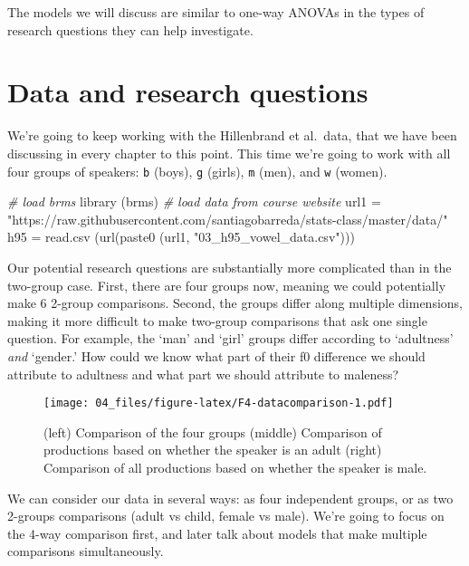 \documentclass[
]{book}
\newenvironment{Shaded}{\begin{snugshade}}{\end{snugshade}}
\newcommand{\CommentTok}[1]{\textcolor[rgb]{0.56,0.35,0.01}{\textit{#1}}}
\newcommand{\FunctionTok}[1]{\textcolor[rgb]{0.00,0.00,0.00}{#1}}
\newcommand{\NormalTok}[1]{#1}
\newcommand{\OtherTok}[1]{\textcolor[rgb]{0.56,0.35,0.01}{#1}}
\newcommand{\StringTok}[1]{\textcolor[rgb]{0.31,0.60,0.02}{#1}}
\begin{document}
The models we will discuss are similar to one-way ANOVAs in the types of research questions they can help investigate.

\hypertarget{data-and-research-questions-3}{%
\section{Data and research questions}\label{data-and-research-questions-3}}

We're going to keep working with the Hillenbrand et al.~data, that we have been discussing in every chapter to this point. This time we're going to work with all four groups of speakers: \texttt{b} (boys), \texttt{g} (girls), \texttt{m} (men), and \texttt{w} (women).

\begin{Shaded}
\begin{Highlighting}[]
\CommentTok{\# load brms}
\FunctionTok{library}\NormalTok{ (brms)}
\CommentTok{\# load data from course website}
\NormalTok{url1 }\OtherTok{=} \StringTok{"https://raw.githubusercontent.com/santiagobarreda/stats{-}class/master/data/"}
\NormalTok{h95 }\OtherTok{=} \FunctionTok{read.csv}\NormalTok{ (}\FunctionTok{url}\NormalTok{(}\FunctionTok{paste0}\NormalTok{ (url1, }\StringTok{"03\_h95\_vowel\_data.csv"}\NormalTok{)))}
\end{Highlighting}
\end{Shaded}

Our potential research questions are substantially more complicated than in the two-group case. First, there are four groups now, meaning we could potentially make 6 2-group comparisons. Second, the groups differ along multiple dimensions, making it more difficult to make two-group comparisons that ask one single question. For example, the `man' and `girl' groups differ according to `adultness' \emph{and} `gender.' How could we know what part of their f0 difference we should attribute to adultness and what part we should attribute to maleness?

\begin{figure}
\centering
\texttt{[image: 04\_files/figure-latex/F4-datacomparison-1.pdf]}
\caption{\label{fig:F4-datacomparison}(left) Comparison of the four groups (middle) Comparison of productions based on whether the speaker is an adult (right) Comparison of all productions based on whether the speaker is male.}
\end{figure}

We can consider our data in several ways: as four independent groups, or as two 2-groups comparisons (adult vs child, female vs male). We're going to focus on the 4-way comparison first, and later talk about models that make multiple comparisons simultaneously.
\end{document}
